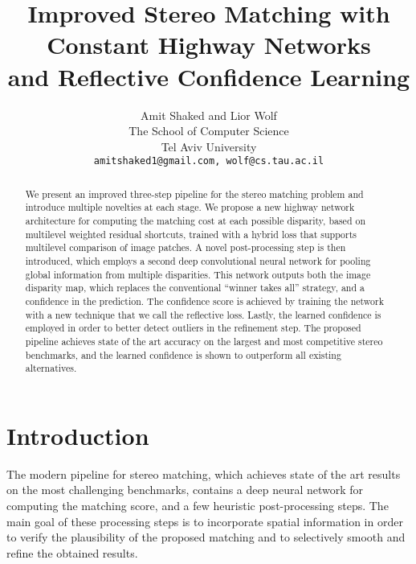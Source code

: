 \documentclass[10pt, twocolumn, letterpaper]{article}
\begin{document}
\title{Improved Stereo Matching with Constant Highway Networks\\ and Reflective Confidence Learning}

\author{Amit Shaked and Lior Wolf\\
The School of Computer Science\\
Tel Aviv University\\
{\tt\small amitshaked1@gmail.com, wolf@cs.tau.ac.il}
}

\maketitle

\begin{abstract}
   We present an improved three-step pipeline for the stereo matching problem and introduce multiple novelties at each stage. We propose a new highway network architecture for computing the matching cost at each possible disparity, based on multilevel weighted residual shortcuts, trained with a hybrid loss that supports multilevel comparison of image patches. A novel post-processing step is then introduced, which employs a second deep convolutional neural network for pooling global information from multiple disparities. This network outputs both the image disparity map, which replaces the conventional ``winner takes all'' strategy, and a confidence in the prediction. The confidence score is achieved by training the network with a new technique that we call the reflective loss. Lastly, the learned confidence is employed in order to better detect outliers in the refinement step. The proposed pipeline achieves state of the art accuracy on the largest and most competitive stereo benchmarks, and the learned confidence is shown to outperform all existing alternatives.
\end{abstract}
\section{Introduction}

The modern pipeline for stereo matching, which achieves state of the art results on the most challenging benchmarks, contains a deep neural network for computing the matching score, and a few heuristic post-processing steps. The main goal of these processing steps is to incorporate spatial information in order to verify the plausibility of the proposed matching and to selectively smooth and refine the obtained results.
\end{document}
